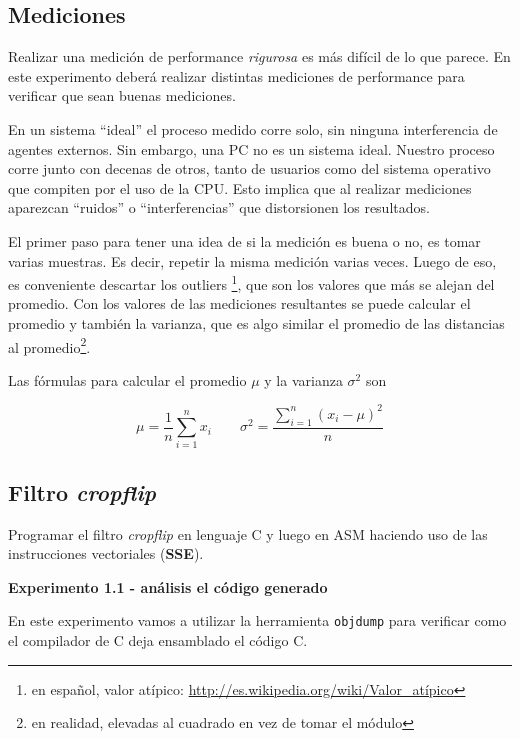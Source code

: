 \subsection{Mediciones}

Realizar una medición de performance \emph{rigurosa} es más difícil de lo 
que parece. 
En este experimento deberá realizar distintas mediciones de performance 
para verificar que sean buenas mediciones.

En un sistema ``ideal'' el proceso medido corre solo, sin ninguna 
interferencia de agentes externos. 
Sin embargo, una PC no es un sistema ideal. 
Nuestro proceso corre junto con decenas de otros, tanto de usuarios como 
del sistema operativo que compiten por el uso de la CPU. 
Esto implica que al realizar mediciones aparezcan ``ruidos'' o 
``interferencias'' que distorsionen los resultados.

El primer paso para tener una idea de si la medición es buena o no, 
es tomar varias muestras. 
Es decir, repetir la misma medición varias veces.
Luego de eso, es conveniente descartar los outliers
\footnote{en español, valor atípico: \url{http://es.wikipedia.org/wiki/Valor_atípico}}, 
que son los valores que más se alejan del promedio. 
Con los valores de las mediciones resultantes se puede calcular el promedio 
y también la varianza, que es algo similar el promedio de las distancias al 
promedio\footnote{en realidad, elevadas al cuadrado en vez de tomar el módulo}.

Las fórmulas para calcular el promedio $\mu$ y la varianza $\sigma^2$ son

$$
\mu = \frac{1}{n}\sum_{i=1}^{n} x_i \qquad \sigma^2 = \frac{\displaystyle\sum_{i=1}^{n}(x_i - \mu)^2} {n}
$$

\subsection{Filtro \textit{cropflip}}

Programar el filtro \textit{cropflip} en lenguaje C y luego en ASM haciendo 
uso de las instrucciones vectoriales (\textbf{SSE}).

\vspace*{0.3cm} \noindent
\textbf{Experimento 1.1 - análisis el código generado}

En este experimento vamos a utilizar la herramienta \verb|objdump| para 
verificar como el compilador de C deja ensamblado el código C.

